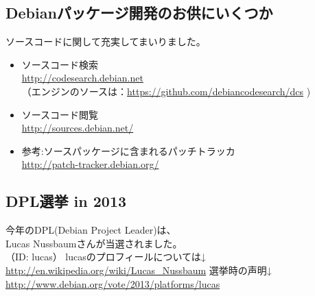 \documentclass[mingoth,a4paper]{jsarticle}
\begin{document}


\subsection{Debianパッケージ開発のお供にいくつか}

ソースコードに関して充実してまいりました。
\begin{itemize}
\item ソースコード検索\\
\url{http://codesearch.debian.net}\\
（エンジンのソースは：\url{https://github.com/debiancodesearch/dcs} )\\
\item ソースコード閲覧\\
\url{http://sources.debian.net/}
\item 参考:ソースパッケージに含まれるパッチトラッカ\\
\url{http://patch-tracker.debian.org/}
\end{itemize}

\subsection{DPL選挙 in 2013}
今年のDPL(Debian Project Leader)は、\\
Lucas Nussbaumさんが当選されました。\\
（ID: lucas）
lucasのプロフィールについては↓\\
\url{http://en.wikipedia.org/wiki/Lucas_Nussbaum}
選挙時の声明↓\\
\url{http://www.debian.org/vote/2013/platforms/lucas}
\end{document}
